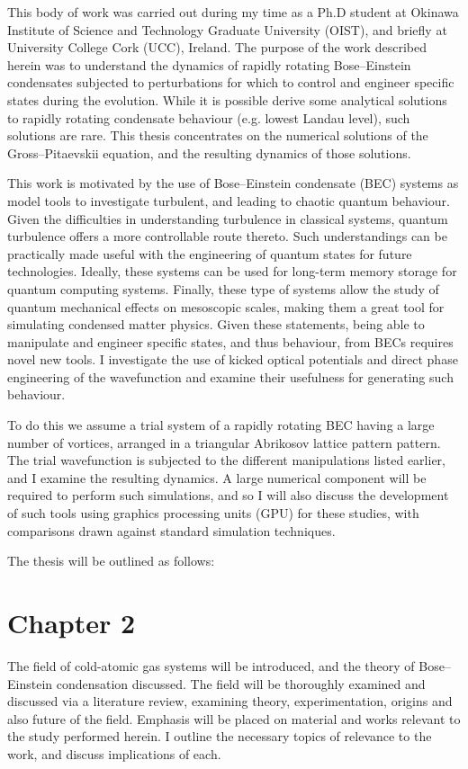 
This body of work was carried out during my time as a Ph.D student at Okinawa Institute of Science and Technology Graduate University (OIST), and briefly at University College Cork (UCC), Ireland. The purpose of the work described herein was to understand the dynamics of rapidly rotating Bose--Einstein condensates subjected to perturbations for which to control and engineer specific states during the evolution. While it is possible derive some analytical solutions to rapidly rotating condensate behaviour (e.g. lowest Landau level), such solutions are rare. This thesis concentrates on the numerical solutions of the Gross--Pitaevskii equation, and the resulting dynamics of those solutions.

This work is motivated by the use of Bose--Einstein condensate (BEC) systems as model tools to investigate turbulent, and leading to chaotic quantum behaviour. Given the difficulties in understanding turbulence in classical systems, quantum turbulence offers a more controllable route thereto. Such understandings can be practically made useful with the engineering of quantum states for future technologies. Ideally, these systems can be used for long-term memory storage for quantum computing systems. Finally, these type of systems allow the study of quantum mechanical effects on mesoscopic scales, making them a great tool for simulating condensed matter physics. Given these statements, being able to manipulate and engineer specific states, and thus behaviour, from BECs requires novel new tools. I investigate the use of kicked optical potentials and direct phase engineering of the wavefunction and examine their usefulness for generating such behaviour.

To do this we assume a trial system of a rapidly rotating BEC having a large number of vortices, arranged in a triangular Abrikosov lattice pattern pattern. The trial wavefunction is subjected to the different manipulations listed earlier, and I examine the resulting dynamics. A large numerical component will be required to perform such simulations, and so I will also discuss the development of such tools using graphics processing units (GPU) for these studies, with comparisons drawn against standard simulation techniques.

The thesis will be outlined as follows:

\section{Chapter 2}
The field of cold-atomic gas systems will be introduced, and the theory of Bose--Einstein condensation discussed. The field will be thoroughly examined and discussed via a literature review, examining theory, experimentation, origins and also future of the field. Emphasis will be placed on material and works relevant to the study performed herein. I outline the necessary topics of relevance to the work, and discuss implications of each.


